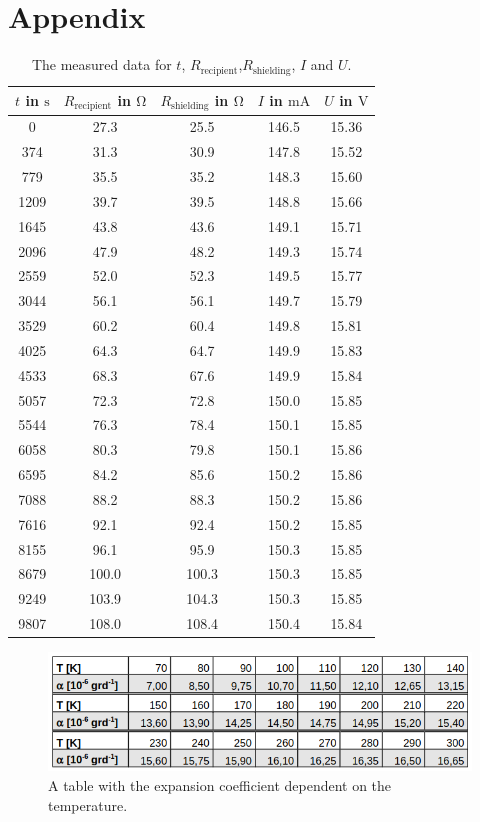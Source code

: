 \section{Appendix}
\label{sec:Anhang}

\begin{table}
    \centering
    \begin{tabular}{c c c c c}
        \toprule
 $t$ in $\si{\s}$ & $R_\text{recipient}$ in $\si{\ohm}$ 
 & $R_\text{shielding}$ in $\si{\ohm}$ & $I$ in $\si{\milli\A}$ &
 $U$ in $\si{\V}$ \\
        \midrule   
0	    & 27.3	& 25.5	 &  146.5	 & 15.36 \\	
374 	& 31.3	& 30.9	 &  147.8	 & 15.52 \\
779 	& 35.5	& 35.2	 &  148.3	 & 15.60 \\
1209	& 39.7	& 39.5	 &  148.8	 & 15.66 \\
1645	& 43.8	& 43.6	 &  149.1	 & 15.71 \\
2096	& 47.9	& 48.2	 &  149.3	 & 15.74 \\
2559	& 52.0	& 52.3	 &  149.5	 & 15.77 \\
3044	& 56.1	& 56.1	 &  149.7	 & 15.79 \\
3529	& 60.2	& 60.4	 &  149.8	 & 15.81 \\
4025	& 64.3	& 64.7	 &  149.9	 & 15.83 \\
4533	& 68.3	& 67.6	 &  149.9	 & 15.84 \\
5057	& 72.3	& 72.8	 &  150.0	 & 15.85 \\
5544	& 76.3	& 78.4	 &  150.1	 & 15.85 \\
6058	& 80.3	& 79.8	 &  150.1	 & 15.86 \\
6595	& 84.2	& 85.6	 &  150.2	 & 15.86 \\
7088	& 88.2	& 88.3	 &  150.2	 & 15.86 \\
7616	& 92.1	& 92.4	 &  150.2	 & 15.85 \\
8155	& 96.1	& 95.9	 &  150.3	 & 15.85 \\
8679	& 100.0	& 100.3	 &  150.3	 & 15.85 \\
9249	& 103.9	& 104.3	 &  150.3	 & 15.85 \\
9807	& 108.0	& 108.4	 &  150.4	 & 15.84 \\
        \bottomrule 
    \end{tabular}
    \caption{The measured data for $t$, $R_\text{recipient}$,$R_\text{shielding}$, $I$ and $U$.}
    \label{tab:Messwerte}
\end{table}

\begin{figure}
    \centering
    \includegraphics[width=\textwidth]{bilder/alpha.png}
   \caption{A table with the expansion coefficient dependent on the temperature.}
   \label{tab:alpha}
\end{figure}
